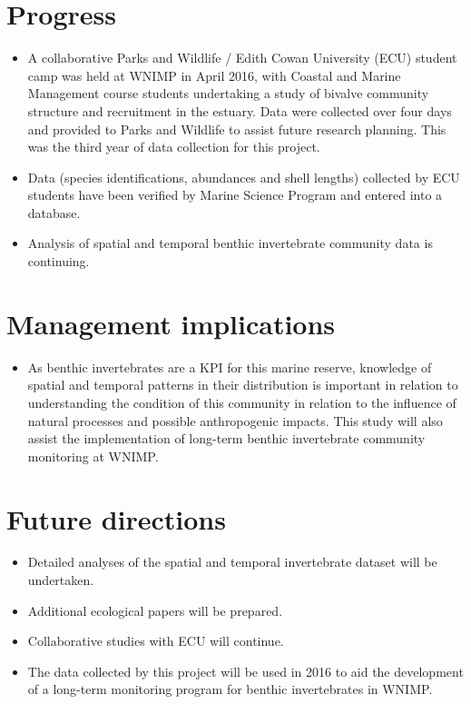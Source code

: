 \documentclass[version=last,
    paper=a4, %
    10pt, %
    usenames,
    dvipsnames,
    oneside, %
    headings=openany, %
    DIV=15 %
]{scrbook}
\begin{document}
\section*{Progress}
\begin{itemize}
\itemsep1pt\parskip0pt
\item
  A collaborative Parks and Wildlife / Edith Cowan University (ECU)
  student camp was held at WNIMP in April 2016, with Coastal and Marine
  Management course students undertaking a study of bivalve community
  structure and recruitment in the estuary. Data were collected over
  four days and provided to Parks and Wildlife to assist future research
  planning. This was the third year of data collection for this project.
\item
  Data (species identifications, abundances and shell lengths) collected
  by ECU students have been verified by Marine Science Program and
  entered into a database.
\item
  Analysis of spatial and temporal benthic invertebrate community data
  is continuing.
\end{itemize}



\section*{Management implications}
\begin{itemize}
\itemsep1pt\parskip0pt
\item
  As benthic invertebrates are a KPI for this marine reserve, knowledge
  of spatial and temporal patterns in their distribution is important in
  relation to understanding the condition of this community in relation
  to the influence of natural processes and possible anthropogenic
  impacts. This study will also assist the implementation of long-term
  benthic invertebrate community monitoring at WNIMP.
\end{itemize}



\section*{Future directions}
\begin{itemize}
\itemsep1pt\parskip0pt
\item
  Detailed analyses of the spatial and temporal invertebrate dataset
  will be undertaken.
\item
  Additional ecological papers will be prepared.
\item
  Collaborative studies with ECU will continue.
\item
  The data collected by this project will be used in 2016 to aid the
  development of a long-term monitoring program for benthic
  invertebrates in WNIMP.
\end{itemize}



\end{document}
